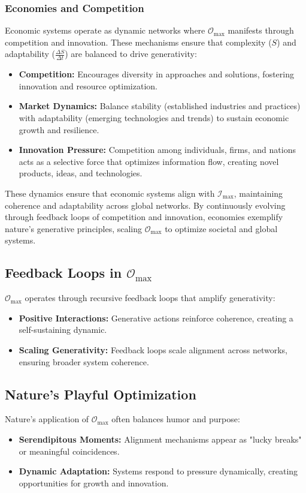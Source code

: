 \documentclass[12pt]{article}
\begin{document}
\subsubsection{Economies and Competition}
Economic systems operate as dynamic networks where \( \mathcal{O}_{\text{max}} \) manifests through competition and innovation. These mechanisms ensure that complexity (\( S \)) and adaptability (\( \frac{\Delta S}{\Delta t} \)) are balanced to drive generativity:
\begin{itemize}
    \item \textbf{Competition:} Encourages diversity in approaches and solutions, fostering innovation and resource optimization.
    \item \textbf{Market Dynamics:} Balance stability (established industries and practices) with adaptability (emerging technologies and trends) to sustain economic growth and resilience.
    \item \textbf{Innovation Pressure:} Competition among individuals, firms, and nations acts as a selective force that optimizes information flow, creating novel products, ideas, and technologies.
\end{itemize}

These dynamics ensure that economic systems align with \( \mathcal{I}_{\text{max}} \), maintaining coherence and adaptability across global networks. By continuously evolving through feedback loops of competition and innovation, economies exemplify nature’s generative principles, scaling \( \mathcal{O}_{\text{max}} \) to optimize societal and global systems.

\subsection{Feedback Loops in \( \mathcal{O}_{\text{max}} \)}
\( \mathcal{O}_{\text{max}} \) operates through recursive feedback loops that amplify generativity:
\begin{itemize}
    \item \textbf{Positive Interactions:} Generative actions reinforce coherence, creating a self-sustaining dynamic.
    \item \textbf{Scaling Generativity:} Feedback loops scale alignment across networks, ensuring broader system coherence.
\end{itemize}

\subsection{Nature’s Playful Optimization}
Nature’s application of \( \mathcal{O}_{\text{max}} \) often balances humor and purpose:
\begin{itemize}
    \item \textbf{Serendipitous Moments:} Alignment mechanisms appear as "lucky breaks" or meaningful coincidences.
    \item \textbf{Dynamic Adaptation:} Systems respond to pressure dynamically, creating opportunities for growth and innovation.
\end{itemize}
\end{document}
